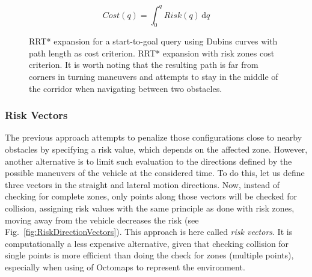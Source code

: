 \begin{equation}
	\label{eq:cost}
	Cost(q)=\int_{0}^{q} Risk(q)\, \mathrm{d}q	
\end{equation}


\begin{figure}[htbp]
\myfloatalign
     \quad
\caption[Start-to-goal queries' solutions obtained by RRT* with Dubins curves.
Optimization criteria comparison between path length and risk zones.]
{\protect{} RRT* expansion for a start-to-goal query using Dubins curves with path length as cost criterion.
\protect{} RRT* expansion with
risk zones cost criterion. It is worth noting that the resulting path is far
from corners in turning maneuvers and attempts to stay in the middle of the
corridor when navigating between two obstacles.}
\label{fig:GeomRRTstarSafe}
\end{figure}

\subsubsection{Risk Vectors} 

The previous approach attempts to penalize those configurations close to nearby
obstacles by specifying a risk value, which depends on the affected zone.
However, another alternative is to limit such evaluation to the directions
defined by the possible maneuvers of the vehicle at the considered time. To do
this, let us define three vectors in the straight and lateral motion directions.
Now, instead of checking for complete zones, only points along those vectors
will be checked for collision, assigning risk values with the same principle as
done with risk zones, \ie moving away from the vehicle decreases the risk (see
Fig.~\ref{fig:RiskDirectionVectors}). This approach is here called \textit{risk
vectors}. It is computationally a less expensive alternative, given that
checking collision for single points is more efficient than doing the check for
zones (multiple points), especially when using of Octomaps to represent the
environment.

